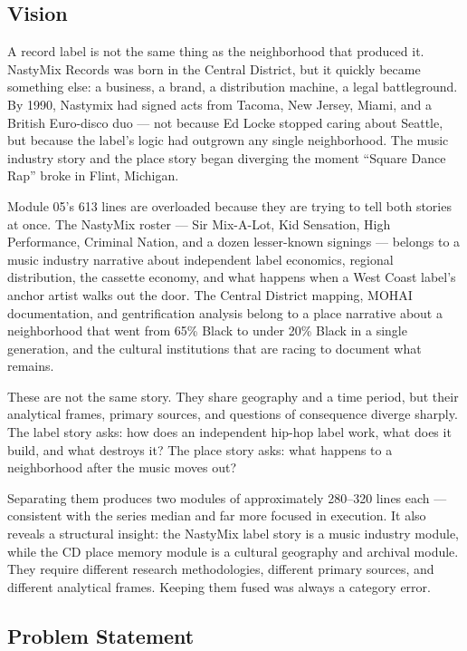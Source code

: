 \documentclass[11pt,letterpaper]{article}
\begin{document}
\subsection{Vision}

A record label is not the same thing as the neighborhood that produced it. NastyMix Records was
born in the Central District, but it quickly became something else: a business, a brand, a distribution
machine, a legal battleground. By 1990, Nastymix had signed acts from Tacoma, New Jersey, Miami,
and a British Euro-disco duo --- not because Ed Locke stopped caring about Seattle, but because the
label's logic had outgrown any single neighborhood. The music industry story and the place story began
diverging the moment ``Square Dance Rap'' broke in Flint, Michigan.

Module 05's 613 lines are overloaded because they are trying to tell both stories at once. The NastyMix
roster --- Sir Mix-A-Lot, Kid Sensation, High Performance, Criminal Nation, and a dozen lesser-known
signings --- belongs to a music industry narrative about independent label economics, regional distribution,
the cassette economy, and what happens when a West Coast label's anchor artist walks out the door. The
Central District mapping, MOHAI documentation, and gentrification analysis belong to a place narrative
about a neighborhood that went from 65\% Black to under 20\% Black in a single generation, and the
cultural institutions that are racing to document what remains.

These are not the same story. They share geography and a time period, but their analytical frames,
primary sources, and questions of consequence diverge sharply. The label story asks: how does an
independent hip-hop label work, what does it build, and what destroys it? The place story asks: what
happens to a neighborhood after the music moves out?

Separating them produces two modules of approximately 280--320 lines each --- consistent with the
series median and far more focused in execution. It also reveals a structural insight: the NastyMix
label story is a music industry module, while the CD place memory module is a cultural geography and
archival module. They require different research methodologies, different primary sources, and different
analytical frames. Keeping them fused was always a category error.

\subsection{Problem Statement}
\end{document}
